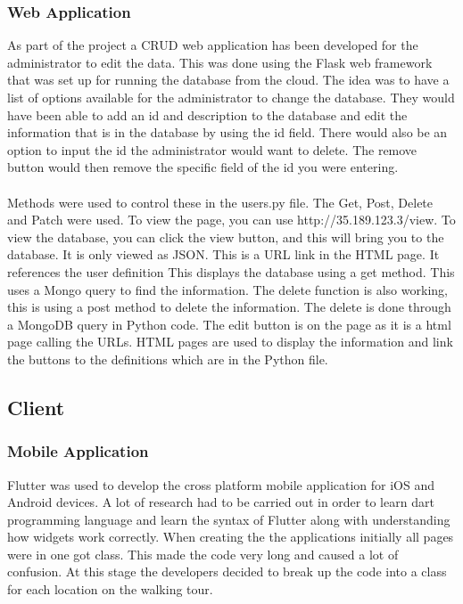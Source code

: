\subsubsection{Web Application}
As part of the project a CRUD web application has been developed for the administrator to edit the data. This was done using the Flask web framework that was set up for running the database from the cloud. The idea was to have a list of options available for the administrator to change the database. They would have been able to add an id and description to the database and edit the information that is in the database by using the id field. There would also be an option to input the id the administrator would want to delete. The remove button would then remove the specific field of the id you were entering. 
\paragraph{}Methods were used to control these in the users.py file. The Get, Post, Delete and Patch were used. To view the page, you can use http://35.189.123.3/view. To view the database, you can click the view button, and this will bring you to the database. It is only viewed as JSON. This is a URL link in the HTML page. It references the user definition This displays the database using a get method. This uses a Mongo query to find the information. The delete function is also working, this is using a post method to delete the information. The delete is done through a MongoDB query in Python code. The edit button is on the page as it is a html page calling the URLs. HTML pages are used to display the information and link the buttons to the definitions which are in the Python file. 

\subsection{Client}

\subsubsection{Mobile Application}
Flutter was used to develop the cross platform mobile application for iOS and Android devices. A lot of research had to be carried out in order to learn dart programming language and learn the syntax of Flutter along with understanding how widgets work correctly. When creating the the applications initially all pages were in one got class. This made the code very long and caused a lot of confusion. At this stage the developers decided to break up the code into a class for each location on the walking tour.

